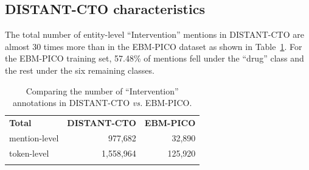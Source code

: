 \documentclass[11pt]{article}
\begin{document}
\subsection{DISTANT-CTO characteristics}
\label{app:char}
%
The total number of entity-level ``Intervention'' mentions in DISTANT-CTO are almost 30 times more than in the EBM-PICO dataset as shown in Table~\ref{table:candcomp}.
For the EBM-PICO training set, 57.48\% of mentions fell under the ``drug'' class and the rest under the six remaining classes.
%
\begin{table}[!htbp]
\centering
\begin{tabular}{lrr}
\Xhline{1pt} \textbf{Total} & \textbf{DISTANT-CTO} & \textbf{EBM-PICO} \\ \Xhline{1pt}
mention-level & 977,682 & 32,890\\
token-level & 1,558,964 & 125,920 \\
\Xhline{1pt}
\end{tabular}
\caption{Comparing the number of ``Intervention'' annotations in DISTANT-CTO \textit{vs.} EBM-PICO.}
\label{table:candcomp} 
\end{table}
\end{document}
